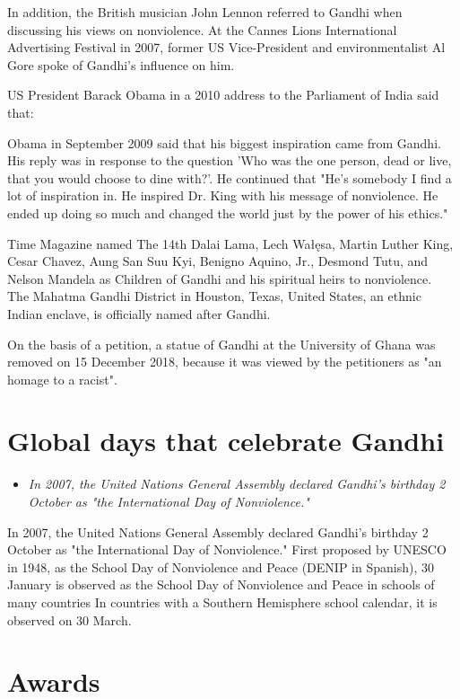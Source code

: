 In addition, the British musician John Lennon referred to Gandhi when
discussing his views on nonviolence. At the Cannes Lions International
Advertising Festival in 2007, former US Vice-President and
environmentalist Al Gore spoke of Gandhi's influence on him.

US President Barack Obama in a 2010 address to the Parliament of India
said that:

Obama in September 2009 said that his biggest inspiration came from
Gandhi. His reply was in response to the question 'Who was the one
person, dead or live, that you would choose to dine with?'. He continued
that "He's somebody I find a lot of inspiration in. He inspired Dr. King
with his message of nonviolence. He ended up doing so much and changed
the world just by the power of his ethics."

Time Magazine named The 14th Dalai Lama, Lech Wałęsa, Martin Luther
King, Cesar Chavez, Aung San Suu Kyi, Benigno Aquino, Jr., Desmond Tutu,
and Nelson Mandela as Children of Gandhi and his spiritual heirs to
nonviolence.\\
The Mahatma Gandhi District in Houston, Texas, United States, an ethnic
Indian enclave, is officially named after Gandhi.

On the basis of a petition, a statue of Gandhi at the University of
Ghana was removed on 15 December 2018, because it was viewed by the
petitioners as "an homage to a racist".

\section{Global days that celebrate
Gandhi}\label{global-days-that-celebrate-gandhi}

\begin{itemize}
\item
  \emph{In 2007, the United Nations General Assembly declared Gandhi's
  birthday 2 October as "the International Day of Nonviolence."}
\end{itemize}

In 2007, the United Nations General Assembly declared Gandhi's birthday
2 October as "the International Day of Nonviolence." First proposed by
UNESCO in 1948, as the School Day of Nonviolence and Peace (DENIP in
Spanish), 30 January is observed as the School Day of Nonviolence and
Peace in schools of many countries In countries with a Southern
Hemisphere school calendar, it is observed on 30 March.

\section{Awards}\label{awards}

